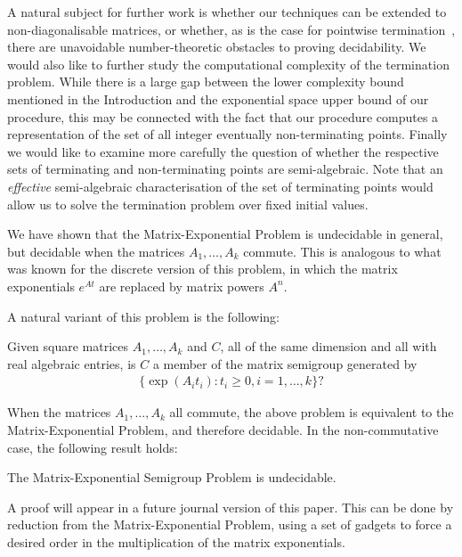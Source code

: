 A natural subject for further work is whether our techniques can be
extended to non-diagonalisable matrices, or whether, as is the case
for pointwise termination~\cite{OW14:SODA}, there are unavoidable
number-theoretic obstacles to proving decidability.  We would also like
to further study the computational complexity of the termination
problem.  While there is a large gap between the \coNP lower
complexity bound mentioned in the Introduction and the exponential
space upper bound of our procedure, this may be connected with the
fact that our procedure computes a representation of the set of all
integer eventually non-terminating points. Finally we would like to
examine more carefully the question of whether the respective sets of
terminating and non-terminating points are semi-algebraic.  Note that
an \emph{effective} semi-algebraic characterisation of the set of
terminating points would allow us to solve the termination problem
over fixed initial values.





We have shown that the Matrix-Exponential Problem is undecidable in
general, but decidable when the matrices $A_{1}, \ldots, A_{k}$ commute.
This is analogous to what was known for the discrete version
of this problem, in which the matrix exponentials $e^{At}$ are
replaced by matrix powers $A^n$.

A natural variant of this problem is the following:
\begin{definition}
  Given square matrices $A_{1}, \ldots, A_{k}$ and $C$, all of the
  same dimension and all with real algebraic entries, is $C$ a member
  of the matrix semigroup generated by
\begin{align*}
\lbrace \exp(A_{i} t_{i}) : t_{i} \geq 0 , i=1,\ldots,k \rbrace ?
\end{align*}
\end{definition}
When the matrices $A_1,\ldots,A_k$ all commute, the above problem is
equivalent to the Matrix-Exponential Problem, and therefore decidable. In the non-commutative case, the following result holds:
\begin{theorem}
The Matrix-Exponential Semigroup Problem is undecidable.
\end{theorem}
A proof will appear in a future journal version of this paper. This can be done by reduction from the Matrix-Exponential Problem, using a set of gadgets to force a desired order in the multiplication of the matrix exponentials.

